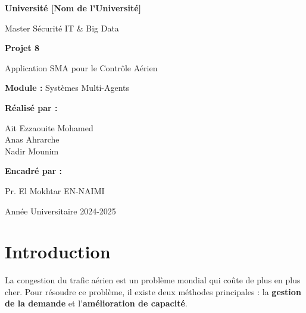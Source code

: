 \documentclass[12pt,a4paper]{article}
\begin{document}
\begin{titlepage}
    \centering
    \vspace*{2cm}

    {\LARGE\bfseries Université [Nom de l'Université]\par}
    \vspace{0.5cm}
    {\Large Master Sécurité IT \& Big Data\par}
    \vspace{2cm}

    {\Huge\bfseries Projet 8\par}
    \vspace{0.5cm}
    {\LARGE Application SMA pour le Contrôle Aérien\par}
    \vspace{3cm}

    {\Large\textbf{Module :} Systèmes Multi-Agents\par}
    \vspace{1.5cm}

    {\Large\textbf{Réalisé par :}\par}
    \vspace{0.3cm}
    {\large
        Ait Ezzaouite Mohamed\\
        Anas Ahrarche\\
        Nadir Mounim\par
    }
    \vspace{1.5cm}

    {\Large\textbf{Encadré par :}\par}
    \vspace{0.3cm}
    {\large Pr. El Mokhtar EN-NAIMI\par}

    \vfill

    {\large Année Universitaire 2024-2025\par}
\end{titlepage}

\tableofcontents
\newpage

\section{Introduction}

La congestion du trafic aérien est un problème mondial qui coûte de plus en plus cher. Pour résoudre ce problème, il existe deux méthodes principales : la \textbf{gestion de la demande} et l'\textbf{amélioration de capacité}.
\end{document}
